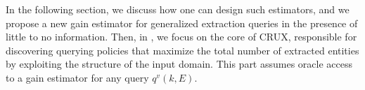 In the following section, we discuss how one can design such estimators, and we propose a new gain estimator for generalized extraction queries in the presence of little to no information. Then, in , we focus on the core of CRUX, responsible for discovering querying policies that maximize the total number of extracted entities by exploiting the structure of the input domain. This part assumes oracle access to a gain estimator for any query $q^v(k,E)$. 